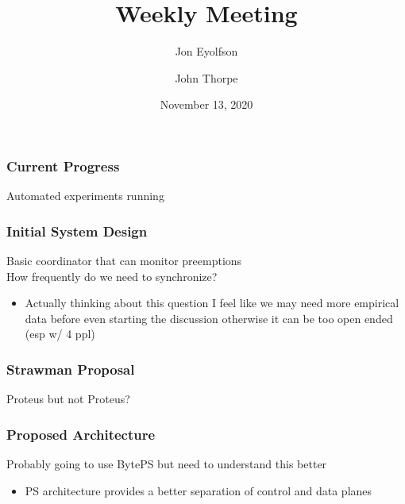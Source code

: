 

\title{Weekly Meeting}
\date{November 13, 2020}
\author{Jon Eyolfson \and John Thorpe}



  \begin{frame}[plain]
    \titlepage
  \end{frame}

  \setcounter{framenumber}{0}

  \begin{frame}
    \frametitle{Current Progress}

    Automated experiments running

  \end{frame}

  \begin{frame}
    \frametitle{Initial System Design}

    Basic coordinator that can monitor preemptions \\
    How frequently do we need to synchronize?
    \begin{itemize}
        \item Actually thinking about this question I feel like we may
            need more empirical data before even starting the discussion
            otherwise it can be too open ended (esp w/ 4 ppl)
    \end{itemize}

  \end{frame}

  \begin{frame}
    \frametitle{Strawman Proposal}

    Proteus but not Proteus?

  \end{frame}

  \begin{frame}
    \frametitle{Proposed Architecture}

    Probably going to use BytePS but need to understand this better
    \begin{itemize}
      \item PS architecture provides a better separation of control and data planes
    \end{itemize}

  \end{frame}


